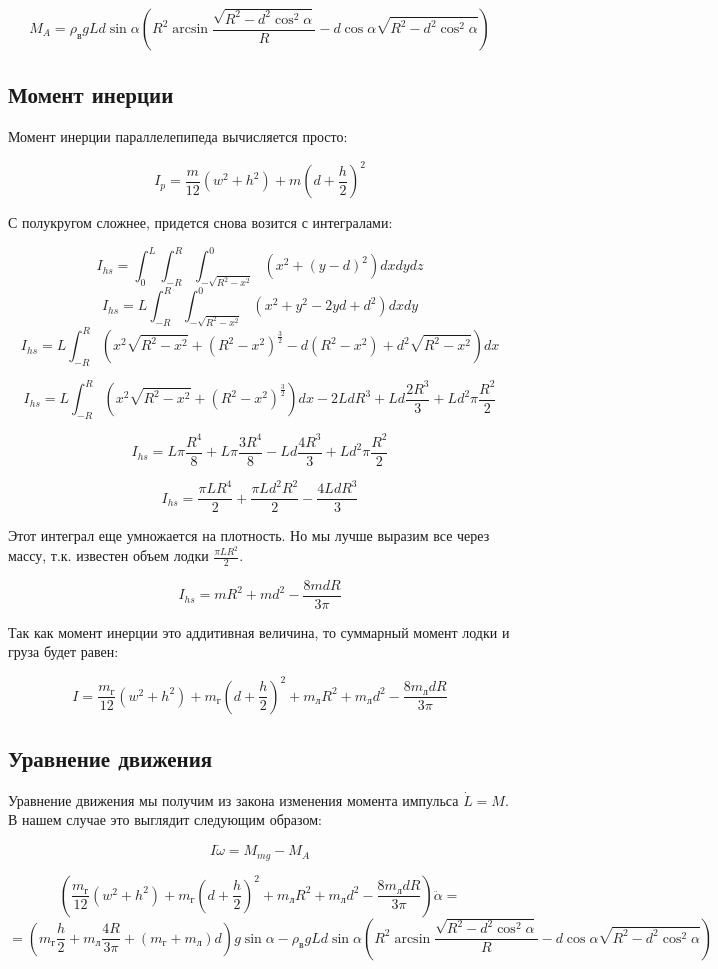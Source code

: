 \documentclass[12pt,a4paper]{article}
\begin{document}
$$ M_A = \rho_\text{в}gLd\sin\alpha (R^2 \arcsin\frac{\sqrt{R^2-d^2\cos^2\alpha}}{R} - d\cos\alpha\sqrt{R^2-d^2\cos^2\alpha}) $$

\subsection{Момент инерции}

Момент инерции параллелепипеда вычисляется просто:

$$ I_p = \frac{m}{12}(w^2 + h^2) + m(d + \frac{h}{2})^2 $$

С полукругом сложнее, придется снова возится с интегралами:

$$ I_{hs} = \int_0^L \int_{-R}^{R} \int_{-\sqrt{R^2 - x^2}}^0 (x^2 + (y-d)^2) dx dy dz $$
$$ I_{hs} = L \int_{-R}^{R} \int_{-\sqrt{R^2 - x^2}}^0 (x^2 + y^2 -2yd + d^2) dx dy $$
$$ I_{hs} = L \int_{-R}^{R} (x^2 \sqrt{R^2 - x^2} + (R^2 - x^2)^\frac{3}{2} - d(R^2 - x^2) + d^2 \sqrt{R^2 - x^2}) dx $$

$$ I_{hs} = L \int_{-R}^{R} (x^2 \sqrt{R^2 - x^2} + (R^2 - x^2)^\frac{3}{2}) dx - 2LdR^3 + Ld\frac{2R^3}{3} + Ld^2\pi\frac{R^2}{2} $$

$$ I_{hs} = L\pi\frac{R^4}{8} + L\pi\frac{3R^4}{8} - Ld\frac{4R^3}{3} + Ld^2\pi\frac{R^2}{2} $$

$$ I_{hs} = \frac{\pi LR^4}{2} + \frac{\pi Ld^2R^2}{2} - \frac{4LdR^3}{3} $$

Этот интеграл еще умножается на плотность. Но мы лучше выразим все через массу, т.к. известен объем лодки $\frac{\pi LR^2}{2}$.

$$ I_{hs} = mR^2 + md^2 - \frac{8mdR}{3\pi}$$

Так как момент инерции это аддитивная величина, то суммарный момент лодки и груза будет равен:

$$ I = \frac{m_\text{г}}{12}(w^2 + h^2) + m_\text{г}(d + \frac{h}{2})^2 + m_\text{л}R^2 + m_\text{л}d^2 - \frac{8m_\text{л}dR}{3\pi}$$

\subsection{Уравнение движения}

Уравнение движения мы получим из закона изменения момента импульса $\dot{L} = M$. В нашем случае это выглядит следующим образом:

$$ I\dot{\omega} = M_{mg} - M_A $$

$$ (\frac{m_\text{г}}{12}(w^2 + h^2) + m_\text{г}(d + \frac{h}{2})^2 + m_\text{л}R^2 + m_\text{л}d^2 - \frac{8m_\text{л}dR}{3\pi})\ddot{\alpha} = $$
$$ = (m_\text{г}\frac{h}{2} + m_\text{л}\frac{4R}{3\pi} + (m_\text{г} + m_\text{л})d)g\sin\alpha -  \rho_\text{в}gLd\sin\alpha (R^2 \arcsin\frac{\sqrt{R^2-d^2\cos^2\alpha}}{R} - d\cos\alpha\sqrt{R^2-d^2\cos^2\alpha}) $$
\end{document}
